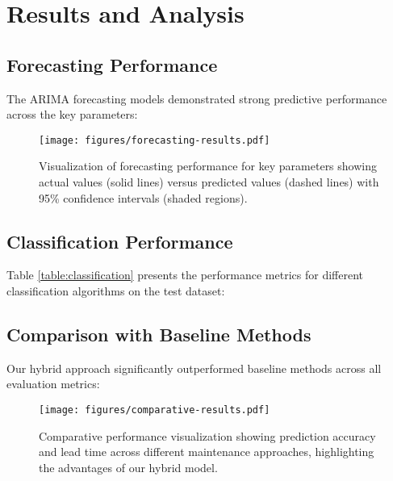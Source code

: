 \section{Results and Analysis}
\subsection{Forecasting Performance}
The ARIMA forecasting models demonstrated strong predictive performance across the key parameters:



\begin{figure}[t]
\centering
\texttt{[image: figures/forecasting-results.pdf]}
\caption{Visualization of forecasting performance for key parameters showing actual values (solid lines) versus predicted values (dashed lines) with 95\% confidence intervals (shaded regions).}
\label{fig:forecasting_results}
\end{figure}

\subsection{Classification Performance}
Table \ref{table:classification} presents the performance metrics for different classification algorithms on the test dataset:



\subsection{Comparison with Baseline Methods}
Our hybrid approach significantly outperformed baseline methods across all evaluation metrics:



\begin{figure}[t]
\centering
\texttt{[image: figures/comparative-results.pdf]}
\caption{Comparative performance visualization showing prediction accuracy and lead time across different maintenance approaches, highlighting the advantages of our hybrid model.}
\label{fig:comparative_results}
\end{figure}